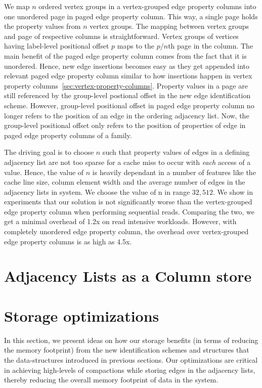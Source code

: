 We map $n$ ordered vertex groups in a vertex-grouped edge property columns into one unordered page in paged edge property column. This way, a single page holds the property values from $n$ vertex groups. The mapping between vertex groups and page of respective columns is straightforward. Vertex groups of vertices having label-level positional offset $p$ maps to the $p/n$th page in the column. The main benefit of the paged edge property column comes from the fact that it is unordered. Hence, new edge insertions becomes easy as they get appended into relevant paged edge property column similar to how insertions happen in vertex property columns~\ref{sec:vertex-property-columns}. Property values in a page are still referenced by the group-level postional offset in the new edge identification scheme. However, group-level positional offset in paged edge property column no longer refers to the position of an edge in the ordering adjacency list. Now, the group-level positional offset only refers to the position of properties of edge in paged edge property columns of a family. 

The driving goal is to choose $n$ such that property values of edges in a defining adjacency list are not too sparse for a cache miss to occur with \emph{each} access of a value. Hence, the value of $n$ is heavily dependant in a number of features like the cache line size, column element width and the average number of edges in the adjacency lists in system. We choose the value of n in range $32, 512$. We show in experiments that our solution is not significantly worse than the vertex-grouped edge property column when performing sequential reads. Comparing the two, we get a minimal overhead of 1.2x on read intensive workloads. However, with completely unordered edge property column, the overhead over vertex-grouped edge property columns is as high as 4.5x.

\section{Adjacency Lists as a Column store}
\label{sec:adjacency-lists}


\section{Storage optimizations}
\label{sec:storage-optimizations}

In this section, we present ideas on how our storage benefits (in terms of reducing the memory footprint) from the new identification schemes and structures that the data-structures introduced in previous sections. Our optimizations are critical in achieving high-levels of compactions while storing edges in the adjacency lists, thereby reducing the overall memory footprint of data in the system.

